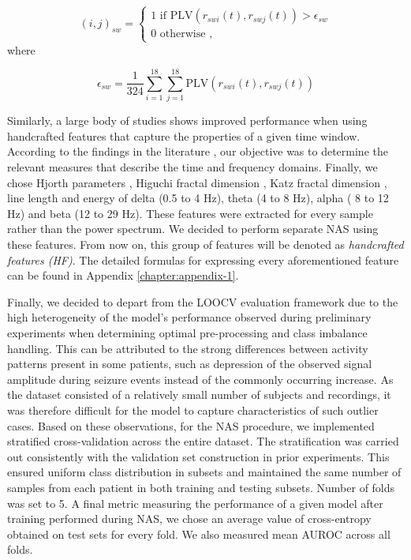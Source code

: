 \documentclass[a4paper,fleqn]{cas-sc}
\begin{document}
\begin{equation}
    (i,j)_{sw} =  
    \begin{cases}
        1 \text{  if  PLV}(r_{swi}(t), r_{swj}(t)) > \epsilon_{sw} \\
        0 \text{  otherwise  },
    \end{cases}
    \label{edges}
\end{equation} where

\begin{equation}
    \epsilon_{sw} = \frac{1}{324} \sum_{i=1}^{18}\sum_{j=1}^{18} \text{PLV}(r_{swi}(t), r_{swj}(t))
    \label{threshold}
\end{equation}

Similarly, a large body of studies shows improved performance when using handcrafted features that capture the properties of a given time window. According to the findings in the literature \cite{JiaEfficientGraphConv, wijayanto2019fdepilepsy}, our objective was to determine the relevant measures that describe the time and frequency domains. Finally, we chose Hjorth parameters \cite{hjorth1970params}, Higuchi fractal dimension \cite{higuchi1988fd}, Katz fractal dimension \cite{esteller2001katzfd}, line length \cite{esteller2001linelength} and energy of delta (0.5 to 4 Hz), theta (4 to 8 Hz), alpha ( 8 to 12 Hz) and beta (12 to 29 Hz). These features were extracted for every sample rather than the power spectrum. We decided to perform separate NAS using these features. From now on, this group of features will be denoted as \textit{handcrafted features (HF)}. The detailed formulas for expressing every aforementioned feature can be found in Appendix \ref{chapter:appendix-1}.

Finally, we decided to depart from the LOOCV evaluation framework due to the high heterogeneity of the model's performance observed during preliminary experiments when determining optimal pre-processing and class imbalance handling. This can be attributed to the strong differences between activity patterns present in some patients, such as depression of the observed signal amplitude during seizure events instead of the commonly occurring increase. As the dataset consisted of a relatively small number of subjects and recordings, it was therefore difficult for the model to capture characteristics of such outlier cases. Based on these observations, for the NAS procedure, we implemented stratified cross-validation across the entire dataset. The stratification was carried out consistently with the validation set construction in prior experiments. This ensured uniform class distribution in subsets and maintained the same number of samples from each patient in both training and testing subsets. Number of folds was set to 5.
A final metric measuring the performance of a given model after training performed during NAS, we chose an average value of cross-entropy obtained on test sets for every fold. We also measured mean AUROC across all folds.
\end{document}
